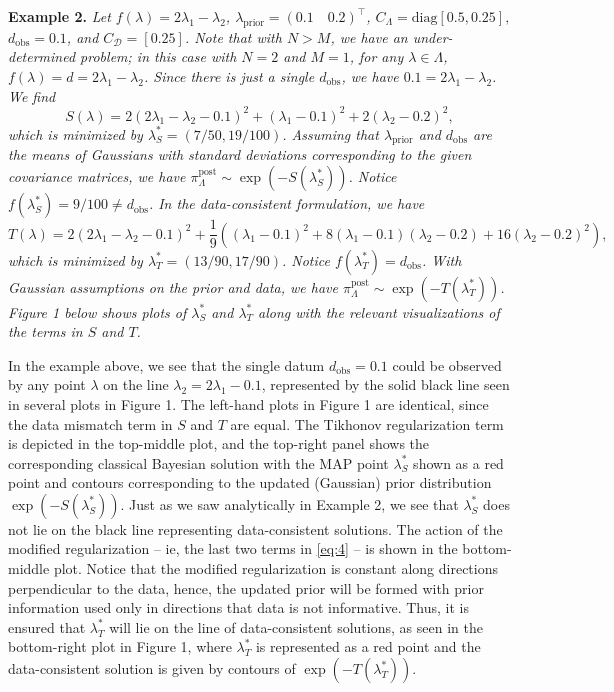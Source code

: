 \documentclass{amsart}
\begin{document}
\noindent \textbf{Example 2.} \textit{Let $f(\lambda)=2\lambda_1-\lambda_2$, $\lambda_\text{prior}=(0.1 \quad 0.2)^\top$, $C_\Lambda=\text{diag}[0.5,0.25],$ $d_\text{obs}=0.1$, and $C_\mathcal{D}=[0.25]$. Note that with $N>M$, we have an under-determined problem; in this case with $N=2$ and $M=1$, for any $\lambda \in \Lambda$, $f(\lambda)=d=2\lambda_1-\lambda_2$. Since there is just a single $d_\text{obs}$, we have $0.1=2\lambda_1-\lambda_2$.
We find $$S(\lambda)=2(2\lambda_1-\lambda_2-0.1)^2+(\lambda_1-0.1)^2+2(\lambda_2-0.2)^2,$$ 
which is minimized by $\lambda^*_S=(7/50,19/100)$. 
Assuming that $\lambda_\text{prior}$ and $d_\text{obs}$ are the means of Gaussians with standard deviations corresponding to the given covariance matrices, we have $\pi_\Lambda^\text{post} \sim \exp(-S(\lambda_S^*))$. 
Notice $f(\lambda^*_S)=9/100\neq d_\text{obs}$. In the data-consistent formulation, we have 
$$T(\lambda)=2(2\lambda_1-\lambda_2-0.1)^2+\frac{1}{9}\left((\lambda_1-0.1)^2+8(\lambda_1-0.1)(\lambda_2-0.2)+16(\lambda_2-0.2)^2\right),$$ 
which is minimized by $\lambda^*_T=(13/90,17/90)$. Notice $f(\lambda^*_T)=d_\text{obs}$. With Gaussian assumptions on the prior and data, we have $\pi_\Lambda^\text{post} \sim \exp(-T(\lambda_T^*))$. Figure 1 below shows plots of $\lambda_S^*$ and $\lambda_T^*$ along with the relevant visualizations of the terms in $S$ and $T$.} 



\vspace{.125cm}




In the example above, we see that the single datum $d_\text{obs}=0.1$ could be observed by any point $\lambda$ on the line $\lambda_2=2\lambda_1-0.1$, represented by the solid black line seen in several plots in Figure 1. The left-hand plots in Figure 1 are identical, since the data mismatch term in $S$ and $T$ are equal. The Tikhonov regularization term is depicted in the top-middle plot, and the top-right panel shows the corresponding classical Bayesian solution with the MAP point $\lambda_S^*$ shown as a red point and contours corresponding to the updated (Gaussian) prior distribution $\exp(-S(\lambda_S^*))$. 
Just as we saw analytically in Example 2, we see that $\lambda_S^*$ does not lie on the black line representing data-consistent solutions. The action of the modified regularization -- ie, the last two terms in \eqref{eq:4} -- is shown in the bottom-middle plot. Notice that the modified regularization is constant along directions perpendicular to the data, hence, the updated prior will be formed with prior information used only in directions that data is not informative. Thus, it is ensured that $\lambda_T^*$ will lie on the line of data-consistent solutions, as seen in the bottom-right plot in Figure 1, where $\lambda_T^*$ is represented as a red point and the data-consistent solution is given by contours of $ \exp(-T(\lambda_T^*))$.
\end{document}
